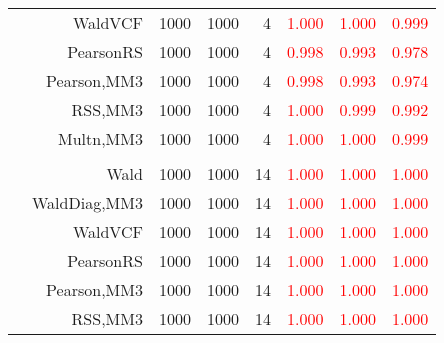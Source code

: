 \documentclass[
]{article}
\begin{document}
\begin{table}[H]
{\begin{tabular}[t]{lrrrrrrr}
\hspace{1em} & WaldVCF & 1000 & 1000 & 4 & \textcolor{red}{1.000} & \textcolor{red}{1.000} & \textcolor{red}{0.999}\\

\hspace{1em} & PearsonRS & 1000 & 1000 & 4 & \textcolor{red}{0.998} & \textcolor{red}{0.993} & \textcolor{red}{0.978}\\

\hspace{1em} & Pearson,MM3 & 1000 & 1000 & 4 & \textcolor{red}{0.998} & \textcolor{red}{0.993} & \textcolor{red}{0.974}\\

\hspace{1em} & RSS,MM3 & 1000 & 1000 & 4 & \textcolor{red}{1.000} & \textcolor{red}{0.999} & \textcolor{red}{0.992}\\

\hspace{1em} & Multn,MM3 & 1000 & 1000 & 4 & \textcolor{red}{1.000} & \textcolor{red}{1.000} & \textcolor{red}{0.999}\\
\cmidrule{1-8}
\addlinespace[0.3em]
\multicolumn{8}{l}{\textbf{1F 15V}}\\
\hspace{1em} & Wald & 1000 & 1000 & 14 & \textcolor{red}{1.000} & \textcolor{red}{1.000} & \textcolor{red}{1.000}\\

\hspace{1em} & WaldDiag,MM3 & 1000 & 1000 & 14 & \textcolor{red}{1.000} & \textcolor{red}{1.000} & \textcolor{red}{1.000}\\

\hspace{1em} & WaldVCF & 1000 & 1000 & 14 & \textcolor{red}{1.000} & \textcolor{red}{1.000} & \textcolor{red}{1.000}\\

\hspace{1em} & PearsonRS & 1000 & 1000 & 14 & \textcolor{red}{1.000} & \textcolor{red}{1.000} & \textcolor{red}{1.000}\\

\hspace{1em} & Pearson,MM3 & 1000 & 1000 & 14 & \textcolor{red}{1.000} & \textcolor{red}{1.000} & \textcolor{red}{1.000}\\

\hspace{1em} & RSS,MM3 & 1000 & 1000 & 14 & \textcolor{red}{1.000} & \textcolor{red}{1.000} & \textcolor{red}{1.000}\\


\end{tabular}}
\end{table}
\end{document}

